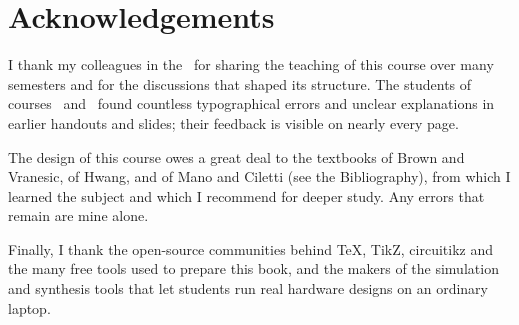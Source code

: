 \chapter*{Acknowledgements}

I thank my colleagues in the \AuthorDept\ for sharing the teaching of this course over many semesters and
for the discussions that shaped its structure. The students of courses \CourseCode\ and \CourseCodeB\ found countless
typographical errors and unclear explanations in earlier handouts and slides; their feedback is visible on nearly every page.

The design of this course owes a great deal to the textbooks of Brown and Vranesic, of Hwang, and of Mano and Ciletti
(see the Bibliography), from which I learned the subject and which I recommend for deeper study. Any errors that remain are mine alone.

Finally, I thank the open-source communities behind \TeX, TikZ, circuitikz and the many free tools used to prepare this book, and
the makers of the simulation and synthesis tools that let students run real hardware designs on an ordinary laptop.

\begin{flushright}
\AuthorName
\end{flushright}
\clearpage
